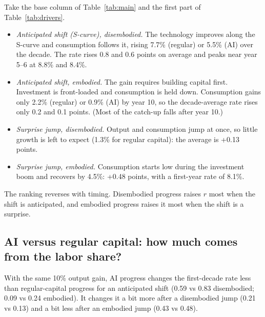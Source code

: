 \documentclass[11pt]{article}
\begin{document}
Take the base column of Table~\ref{tab:main} and the first part of Table~\ref{tab:drivers}.

\begin{table}[h]\centering\scriptsize
\caption{Base household. $\Delta\ln c$ is the gain in detrended consumption from year 0 to 10 (percent); the next column is the right-hand side of (\ref{eq:id}) divided by 10. Wages and output are log deviations (percent) at year 10; labor share in percent.}\label{tab:drivers}
\resizebox{\textwidth}{!}{}
\end{table}

\begin{itemize}
\item \emph{Anticipated shift (S-curve), disembodied.} The technology improves along the S-curve and
consumption follows it, rising 7.7\% (regular) or 5.5\% (AI) over the decade. The rate rises
0.8 and 0.6 points on average and peaks near year 5--6 at 8.8\% and 8.4\%.
\item \emph{Anticipated shift, embodied.} The gain requires building capital first. Investment is front-loaded and
consumption is held down. Consumption gains only 2.2\% (regular) or 0.9\% (AI) by year 10, so the decade-average
rate rises only 0.2 and 0.1 points. (Most of the catch-up falls after year 10.)
\item \emph{Surprise jump, disembodied.} Output and consumption jump at once, so little growth is left to expect
(1.3\% for regular capital): the average is +0.13 points.
\item \emph{Surprise jump, embodied.} Consumption starts low during the investment boom and recovers by 4.5\%:
+0.48 points, with a first-year rate of 8.1\%.
\end{itemize}
The ranking reverses with timing. Disembodied progress raises $r$ most when the shift is anticipated, and embodied
progress raises it most when the shift is a surprise.

\subsection{AI versus regular capital: how much comes from the labor share?}

With the same 10\% output gain, AI progress changes the first-decade rate less than regular-capital progress for an
anticipated shift (0.59 vs 0.83 disembodied; 0.09 vs 0.24 embodied). It changes it a bit more after a disembodied jump (0.21 vs
0.13) and a bit less after an embodied jump (0.43 vs 0.48).
\end{document}
